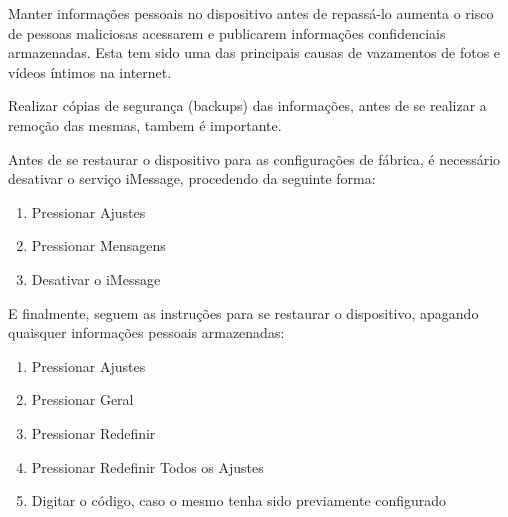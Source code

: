 Manter informa\c c\~oes pessoais no dispositivo antes de repass\'a-lo aumenta o risco de pessoas maliciosas acessarem e publicarem informa\c c\~oes confidenciais armazenadas. Esta tem sido uma das principais causas de vazamentos de fotos e v\'ideos \'intimos na internet. 

Realizar c\'opias de seguran\c ca (backups) das informa\c c\~oes, antes de se realizar a remo\c c\~ao das mesmas, tambem \'e importante.

Antes de se restaurar o dispositivo para as configura\c c\~oes de f\'abrica, \'e necess\'ario desativar o servi\c co iMessage, procedendo da seguinte forma:

\begin{enumerate}
\item Pressionar Ajustes
\item Pressionar Mensagens
\item Desativar o iMessage
\end{enumerate}

E finalmente, seguem as instru\c c\~oes para se restaurar o dispositivo, apagando quaisquer informa\c c\~oes pessoais armazenadas:

\begin{enumerate}
\item Pressionar Ajustes
\item Pressionar Geral
\item Pressionar Redefinir
\item Pressionar Redefinir Todos os Ajustes
\item Digitar o c\'odigo, caso o mesmo tenha sido previamente configurado
\end{enumerate}
